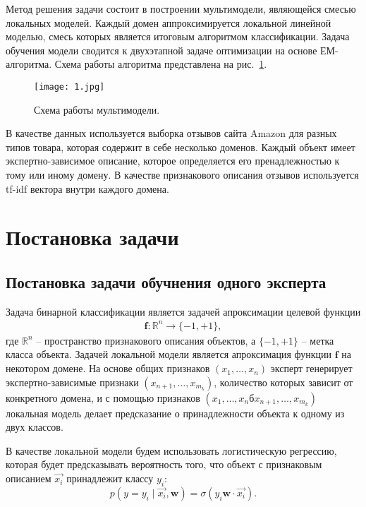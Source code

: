 \documentclass[12pt, twoside]{article}
\begin{document}
Метод решения задачи состоит в построении мультимодели, являющейся смесью локальных моделей. Каждый домен аппроксимируется локальной линейной моделью, смесь которых является итоговым алгоритмом классификации. Задача обучения модели сводится к двухэтапной задаче оптимизации на основе ЕМ-алгоритма. Схема работы алгоритма представлена на рис.~\ref{example:1}.

\begin{figure}[H]\center
\texttt{[image: 1.jpg]}
\caption{Схема работы мультимодели.}
\label{example:1}
\end{figure}

В качестве данных используется выборка отзывов сайта Amazon для разных типов товара, которая содержит в себе несколько доменов. Каждый объект имеет экспертно-зависимое описание, которое определяется его пренадлежностью к тому или иному домену. В качестве признакового описания отзывов используется tf-idf вектора внутри каждого домена. 


\section{Постановка задачи}
\subsection{Постановка задачи обучнения одного эксперта}
Задача бинарной классификации является задачей апроксимации целевой функции
\[
\label{eq:st:1.1}
\begin{aligned}
\mathbf{f}: \mathbb{R}^n \to \{-1, +1\},
\end{aligned}
\]
где $\mathbb{R}^n$ -- пространство признакового описания объектов, а $\{-1, +1\}$ -- метка класса объекта. Задачей локальной модели является апроксимация функции $\mathbf{f}$ на некотором домене. На основе общих признаков $(x_1, \ldots, x_n)$ эксперт генерирует экспертно-зависимые признаки $(x_{n+1}, \ldots, x_{m_k})$, количество которых зависит от конкретного домена, и с помощью признаков $(x_1, \ldots, x_nб x_{n+1}, \ldots, x_{m_k})$ локальная модель делает предсказание о принадлежности объекта к одному из двух классов.

В качестве локальной модели будем использовать логистическую регрессию, которая будет предсказывать вероятность того, что объект с признаковым описанием $\vec{x_i}$ принадлежит классу $y_i$:
\[p\left(y = y_i \mid \vec{x_i}, \mathbf{w}\right) = \sigma(y_i \mathbf{w} \cdot \vec{x_i}).\]
\end{document}
